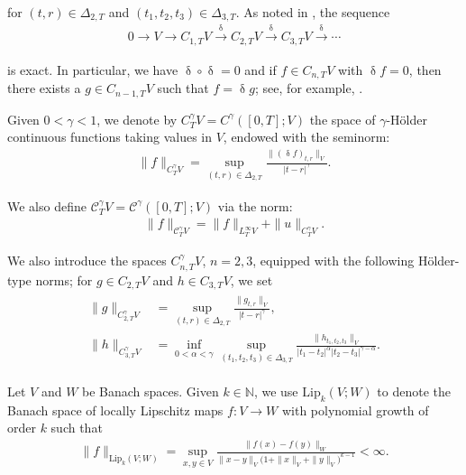 \documentclass[letterpaper, 11pt,  reqno]{amsart}
\newcommand{\1}{\hspace{0.5mm}\text{I}\hspace{0.5mm}}
\newcommand{\noi}{\noindent}
\newcommand{\CC}{\mathcal{C}}
\newcommand{\al}{\alpha}
\newcommand{\updl}{\updelta}
\newcommand{\Dl}{\Delta}
\newcommand{\g}{\gamma}
\newcommand{\N}{\mathbb{N}}
\newcommand{\Lip}{\mathrm{Lip}}
\newcommand{\too}{\longrightarrow}
\numberwithin{equation}{section}
\numberwithin{theorem}{section}
\begin{document}
\noi
for $(t,r)\in\Dl_{2,T}$
and $(t_1,t_2,t_3) \in \Dl_{3,T}$.
As noted in \cite{GT10}, 
the sequence 
\begin{align*}
0 \too V \too C_{1, T}V \stackrel{\updl}{\too} C_{2, T}V
\stackrel{\updl}{\too} C_{3, T}V
\stackrel{\updl}{\too} \cdots
\end{align*}

\noi
is exact. 
In particular, we have 
 $\updl\circ\updl =0$ and 
if $f \in C_{n,T} V$ with $\updl f =0$, 
then there exists a $g\in C_{n-1,T}V$ 
such that $f= \updl g$; 
see, for example,  \cite[Lemma 2.1]{GT10}. 


Given $0 < \g < 1$, we denote by $C^\g_T V = C^\g([0, T]; V)$ the space of $\g$-H\"older continuous functions taking values in $V$, endowed  with the seminorm:
\begin{align*}
\|f\|_{C^\g_T V} = \sup_{(t,r)\in \Dl_{2,T}} 
\frac{\|(\updl f)_{t,r}\|_V}{|t-r|^\g}.
\end{align*}

\noi
We also define 
 $\CC^\g_T V = \CC^\g([0, T]; V)$ via the norm:
\begin{align}
\| f \|_{\CC^\g_TV} = \| f \|_{L^\infty_TV} + \|u\|_{C^\g_T V}.
\label{Ho2a}
\end{align}


\noi 
We also introduce the spaces 
$C^\g_{n,T}V$, $n=2,3$, 
equipped with the following H\"older-type norms;
 for $g\in C_{2,T}V$ and $h\in C_{3,T}V$, we set
\begin{align}
\begin{split}
\| g\|_{C^\g_{2,T} V} & 
= \sup_{(t,r) \in \Dl_{2,T}} \frac{\|g_{t,r} \|_{V} }{|t-r|^{\g}}, \\
\| h\|_{C^\g_{3,T} V} & 
= \inf_{0<\al<\g} 
\sup_{(t_1,t_2,t_3) \in \Dl_{3,T}} 
\frac{ \|h_{t_1,t_2,t_3}\|_V}
{|t_1-t_2|^{\al} |t_2-t_3|^{\g-\al}}.
\end{split}
\label{Ho2}
\end{align}




\medskip


Let $V$ and $W$ be Banach spaces.
Given $k \in \N$, 
we  use $\Lip_k(V; W)$ 
to denote the Banach space of 
locally Lipschitz maps $f:V\to W$
with polynomial growth of order $k$
such that 
\begin{align}
\|f\|_{\Lip_k(V; W)} = 
\sup_{x,y\in V} 
\frac{\|f(x)-f(y)\|_W}{\|x-y\|_V \big(1+\|x\|_V+\|y\|_V\big)^{k-1}}
<\infty .
\label{Lip1}
\end{align}
\end{document}
